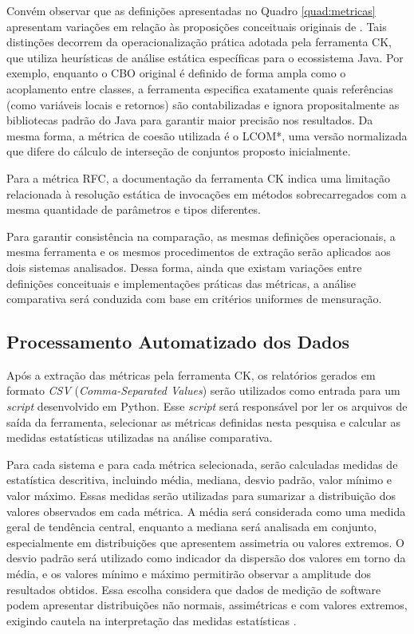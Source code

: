 Convém observar que as definições apresentadas no Quadro \ref{quad:metricas} apresentam variações em relação às proposições conceituais 
originais de . Tais distinções decorrem da operacionalização prática adotada pela ferramenta CK, que utiliza 
heurísticas de análise estática específicas para o ecossistema Java. Por exemplo, enquanto o CBO original é definido de forma ampla como
o acoplamento entre classes, a ferramenta especifica exatamente quais referências (como variáveis locais e retornos) são contabilizadas e
ignora propositalmente as bibliotecas padrão do Java para garantir maior precisão nos resultados. Da mesma forma, a métrica de coesão 
utilizada é o LCOM*, uma versão normalizada que difere do cálculo de interseção de conjuntos proposto inicialmente.

Para a métrica RFC, a documentação da ferramenta CK indica uma limitação relacionada à resolução estática de invocações em 
métodos sobrecarregados com a mesma quantidade de parâmetros e tipos diferentes.

Para garantir consistência na comparação, as mesmas definições operacionais, a mesma ferramenta e os mesmos procedimentos de extração 
serão aplicados aos dois sistemas analisados. Dessa forma, ainda que existam variações entre definições conceituais e implementações 
práticas das métricas, a análise comparativa será conduzida com base em critérios uniformes de mensuração.

\subsection{Processamento Automatizado dos Dados}
\label{subsec:processamento-dados}

Após a extração das métricas pela ferramenta CK, os relatórios gerados em formato \textit{CSV} (\textit{Comma-Separated Values}) serão 
utilizados como entrada para um \textit{script} desenvolvido em Python. Esse \textit{script} será responsável por ler os arquivos de saída da 
ferramenta, selecionar as métricas definidas nesta pesquisa e calcular as medidas estatísticas utilizadas na análise comparativa.

Para cada sistema e para cada métrica selecionada, serão calculadas medidas de estatística descritiva, incluindo média, mediana, 
desvio padrão, valor mínimo e valor máximo. Essas medidas serão utilizadas para sumarizar a distribuição dos valores observados em 
cada métrica. A média será considerada como uma medida geral de tendência central, enquanto a mediana será analisada em conjunto, 
especialmente em distribuições que apresentem assimetria ou valores extremos. O desvio padrão será utilizado como indicador da 
dispersão dos valores em torno da média, e os valores mínimo e máximo permitirão observar a amplitude dos resultados obtidos. 
Essa escolha considera que dados de medição de software podem apresentar distribuições não normais, assimétricas e com valores 
extremos, exigindo cautela na interpretação das medidas estatísticas \cite{fenton2015}.

